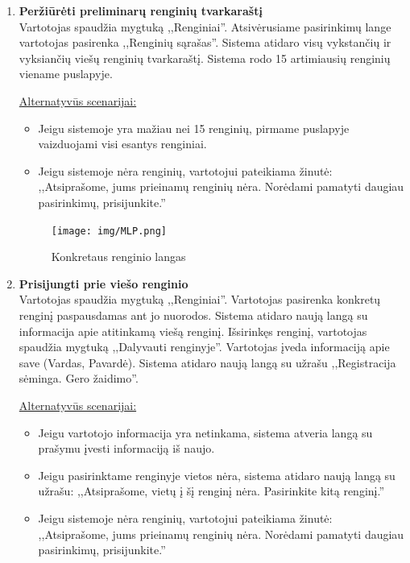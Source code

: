 \documentclass{VUMIFPSkursinis}
\begin{document}
\begin{enumerate} [label = \textbf{U\arabic*.}]
				\begin{figure}[H]
					\centering
					\texttt{[image: img/MLP.png]}
					\caption{Preliminaraus renginių tvarkaraščio langas}
					\label{fig:prelim-tvark-langas}
				\end{figure}
			
			\item \textbf{Peržiūrėti preliminarų renginių tvarkaraštį} \\
					Vartotojas spaudžia mygtuką ,,Renginiai''. 
					Atsivėrusiame pasirinkimų lange vartotojas pasirenka ,,Renginių sąrašas''.
					Sistema atidaro visų vykstančių ir vyksiančių viešų renginių tvarkaraštį. 
					Sistema rodo 15 artimiausių renginių viename puslapyje.
					
					\underline{Alternatyvūs scenarijai:}
					\begin{itemize}
						\item Jeigu sistemoje yra mažiau nei 15 renginių, pirmame puslapyje vaizduojami visi esantys renginiai. 
						\item Jeigu sistemoje nėra renginių, vartotojui pateikiama žinutė:
						,,Atsiprašome, jums prieinamų renginių nėra. Norėdami pamatyti daugiau pasirinkimų, prisijunkite.''
					\end{itemize}

				\begin{figure}[H]
					\centering
					\texttt{[image: img/MLP.png]}
					\caption{Konkretaus renginio langas}
					\label{fig:konkretaus-renginio-langas}
				\end{figure}
			
			\item \textbf{Prisijungti prie viešo renginio} \\
					Vartotojas spaudžia mygtuką ,,Renginiai''. 
					Vartotojas pasirenka konkretų renginį paspausdamas ant jo nuorodos.
					Sistema atidaro naują langą su informacija apie atitinkamą viešą renginį.
					Išsirinkęs renginį, vartotojas spaudžia mygtuką ,,Dalyvauti renginyje''. 
					Vartotojas įveda informaciją apie save (Vardas, Pavardė). 
					Sistema atidaro naują langą su užrašu ,,Registracija sėminga. Gero žaidimo''.
					
					\underline{Alternatyvūs scenarijai:}
					\begin{itemize}
						\item Jeigu vartotojo informacija yra netinkama, sistema atveria langą su prašymu įvesti informaciją iš naujo. 
						\item Jeigu pasirinktame renginyje vietos nėra, 
						sistema atidaro naują langą su užrašu: ,,Atsiprašome, vietų į šį renginį nėra. Pasirinkite kitą renginį.''
						\item Jeigu sistemoje nėra renginių, vartotojui pateikiama žinutė:
						,,Atsiprašome, jums prieinamų renginių nėra. Norėdami pamatyti daugiau pasirinkimų, prisijunkite.''
					\end{itemize}


\end{enumerate}
\end{document}
